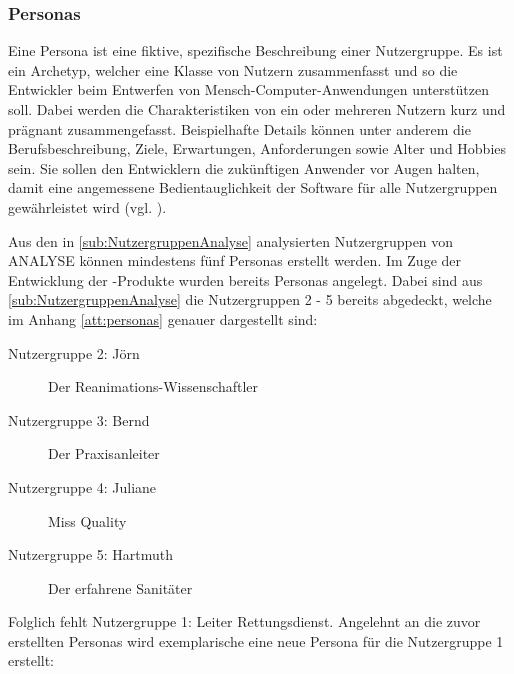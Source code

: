 \subsubsection{Personas}
Eine Persona ist eine fiktive, spezifische Beschreibung einer Nutzergruppe.
Es ist ein \gls{Archetyp}, welcher eine Klasse von Nutzern zusammenfasst und so die Entwickler beim Entwerfen von Mensch-Computer-Anwendungen unterstützen soll.
Dabei werden die Charakteristiken von ein oder mehreren Nutzern kurz und prägnant zusammengefasst.
Beispielhafte Details können unter anderem die Berufsbeschreibung, Ziele, Erwartungen, Anforderungen sowie Alter und Hobbies sein.
Sie sollen den Entwicklern die zukünftigen Anwender vor Augen halten, damit eine angemessene Bedientauglichkeit der Software für alle Nutzergruppen gewährleistet wird (vgl. \cite[3.2, S.11]{Karwowski.2011,Pruitt.2006}).

Aus den in \ref{sub:NutzergruppenAnalyse} analysierten Nutzergruppen von \gls{ANALYSE} können mindestens fünf Personas erstellt werden.
Im Zuge der Entwicklung der \cweb-Produkte wurden bereits Personas angelegt.
Dabei sind aus \ref{sub:NutzergruppenAnalyse} die Nutzergruppen 2 - 5 bereits abgedeckt, welche im Anhang \ref{att:personas} genauer dargestellt sind:
\begin{description}
\item[Nutzergruppe 2: Jörn]
	\glqq Der Reanimations-Wissenschaftler\grqq 
\item[Nutzergruppe 3: Bernd]
	\glqq Der Praxisanleiter\grqq 
\item[Nutzergruppe 4: Juliane]
	\glqq Miss Quality\grqq
\item[Nutzergruppe 5: Hartmuth]
	\glqq Der erfahrene Sanitäter\grqq
\end{description}

Folglich fehlt Nutzergruppe 1: Leiter Rettungsdienst.
Angelehnt an die zuvor erstellten Personas wird exemplarische eine neue Persona für die Nutzergruppe 1 erstellt:

